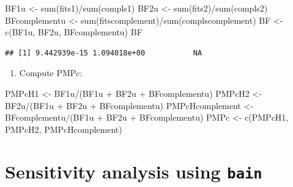 \documentclass[
]{book}
\newenvironment{Shaded}{\begin{snugshade}}{\end{snugshade}}
\newcommand{\FunctionTok}[1]{\textcolor[rgb]{0.00,0.00,0.00}{#1}}
\newcommand{\NormalTok}[1]{#1}
\newcommand{\OtherTok}[1]{\textcolor[rgb]{0.56,0.35,0.01}{#1}}
\newcommand{\SpecialCharTok}[1]{\textcolor[rgb]{0.00,0.00,0.00}{#1}}
\providecommand{\tightlist}{%
  \setlength{\itemsep}{0pt}\setlength{\parskip}{0pt}}
\begin{document}
\begin{Shaded}
\begin{Highlighting}[]
\NormalTok{BF1u }\OtherTok{\textless{}{-}} \FunctionTok{sum}\NormalTok{(fits1)}\SpecialCharTok{/}\FunctionTok{sum}\NormalTok{(compls1)}
\NormalTok{BF2u }\OtherTok{\textless{}{-}} \FunctionTok{sum}\NormalTok{(fits2)}\SpecialCharTok{/}\FunctionTok{sum}\NormalTok{(compls2)}
\NormalTok{BFcomplementu }\OtherTok{\textless{}{-}} \FunctionTok{sum}\NormalTok{(fitscomplement)}\SpecialCharTok{/}\FunctionTok{sum}\NormalTok{(complscomplement)}
\NormalTok{BF }\OtherTok{\textless{}{-}} \FunctionTok{c}\NormalTok{(BF1u, BF2u, BFcomplementu)}
\NormalTok{BF}
\end{Highlighting}
\end{Shaded}

\begin{verbatim}
## [1] 9.442939e-15 1.094018e+00           NA
\end{verbatim}

\begin{enumerate}
\def\labelenumi{\arabic{enumi})}
\setcounter{enumi}{4}
\tightlist
\item
  Compute PMPc:
\end{enumerate}

\begin{Shaded}
\begin{Highlighting}[]
\NormalTok{PMPcH1 }\OtherTok{\textless{}{-}}\NormalTok{ BF1u}\SpecialCharTok{/}\NormalTok{(BF1u }\SpecialCharTok{+}\NormalTok{ BF2u }\SpecialCharTok{+}\NormalTok{ BFcomplementu)}
\NormalTok{PMPcH2 }\OtherTok{\textless{}{-}}\NormalTok{ BF2u}\SpecialCharTok{/}\NormalTok{(BF1u }\SpecialCharTok{+}\NormalTok{ BF2u }\SpecialCharTok{+}\NormalTok{ BFcomplementu)}
\NormalTok{PMPcHcomplement }\OtherTok{\textless{}{-}}\NormalTok{ BFcomplementu}\SpecialCharTok{/}\NormalTok{(BF1u }\SpecialCharTok{+}\NormalTok{ BF2u }\SpecialCharTok{+}\NormalTok{ BFcomplementu)}
\NormalTok{PMPc }\OtherTok{\textless{}{-}} \FunctionTok{c}\NormalTok{(PMPcH1, PMPcH2, PMPcHcomplement)}
\end{Highlighting}
\end{Shaded}

\hypertarget{sensitivity-analysis-using-bain}{%
\chapter{\texorpdfstring{Sensitivity analysis using \texttt{bain}}{Sensitivity analysis using bain}}\label{sensitivity-analysis-using-bain}}
\end{document}
